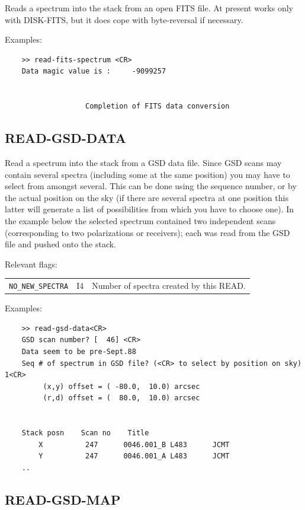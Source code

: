 \documentclass[11pt,twoside]{report}
\begin{document}
Reads a spectrum into the stack from an open FITS file. At present works
only with DISK-FITS, but it does cope with byte-reversal if necessary.

Examples:
\begin{verbatim}
    >> read-fits-spectrum <CR>
    Data magic value is :     -9099257


                   Completion of FITS data conversion

\end{verbatim}

\subsection{READ-GSD-DATA} 

Read a spectrum into the stack from a GSD data file. Since GSD scans may
contain several spectra (including some at the same position) you may have
to select from amongst several. This can be done using the sequence number,
or by the actual position on the sky (if there are several spectra at one
position this latter will generate a list of possibilities from which you
have to choose one). In the example below the selected spectrum contained
two independent scans (corresponding to two polarizations or receivers);
each was read from the GSD file and pushed onto the stack.

Relevant flags:\\
\begin{tabular}{lll}
  \verb+NO_NEW_SPECTRA+ & I4 & Number of spectra created by this READ.
\end{tabular}

Examples:
\begin{verbatim}
    >> read-gsd-data<CR>
    GSD scan number? [  46] <CR>
    Data seem to be pre-Sept.88
    Seq # of spectrum in GSD file? (<CR> to select by position on sky) 1<CR>
         (x,y) offset = ( -80.0,  10.0) arcsec
         (r,d) offset = (  80.0,  10.0) arcsec


    Stack posn    Scan no    Title
        X          247      0046.001_B L483      JCMT
        Y          247      0046.001_A L483      JCMT
    ..
\end{verbatim}

\subsection{READ-GSD-MAP} 
\end{document}
